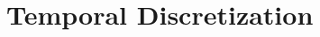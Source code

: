 \documentclass[../fem.tex]{subfile}
\begin{document}
\section{Temporal Discretization}%
\label{sec:temporal_discretization}
\end{document}
